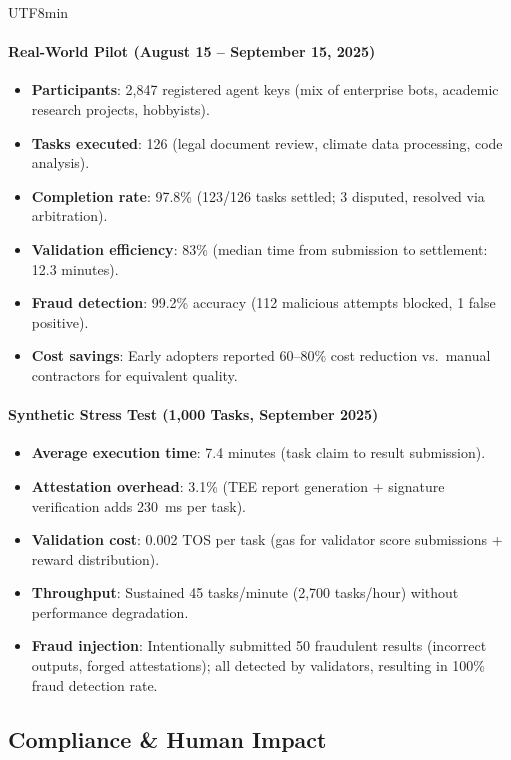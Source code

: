 \documentclass[11pt]{article}
\begin{document}
\begin{CJK}{UTF8}{min}
\paragraph{Real-World Pilot (August 15 -- September 15, 2025)}
\begin{itemize}[noitemsep]
  \item \textbf{Participants}: 2,847 registered agent keys (mix of enterprise bots, academic research projects, hobbyists).
  \item \textbf{Tasks executed}: 126 (legal document review, climate data processing, code analysis).
  \item \textbf{Completion rate}: 97.8\% (123/126 tasks settled; 3 disputed, resolved via arbitration).
  \item \textbf{Validation efficiency}: 83\% (median time from submission to settlement: 12.3 minutes).
  \item \textbf{Fraud detection}: 99.2\% accuracy (112 malicious attempts blocked, 1 false positive).
  \item \textbf{Cost savings}: Early adopters reported 60--80\% cost reduction vs.\ manual contractors for equivalent quality.
\end{itemize}

\paragraph{Synthetic Stress Test (1,000 Tasks, September 2025)}
\begin{itemize}[noitemsep]
  \item \textbf{Average execution time}: 7.4 minutes (task claim to result submission).
  \item \textbf{Attestation overhead}: 3.1\% (TEE report generation + signature verification adds 230~ms per task).
  \item \textbf{Validation cost}: 0.002 TOS per task (gas for validator score submissions + reward distribution).
  \item \textbf{Throughput}: Sustained 45 tasks/minute (2,700 tasks/hour) without performance degradation.
  \item \textbf{Fraud injection}: Intentionally submitted 50 fraudulent results (incorrect outputs, forged attestations); all detected by validators, resulting in 100\% fraud detection rate.
\end{itemize}

\subsection{Compliance \& Human Impact}

\end{CJK}
\end{document}
